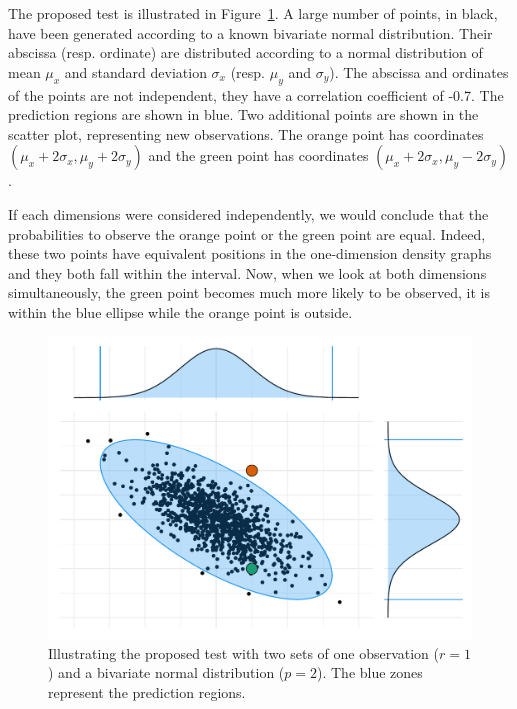             The proposed test is illustrated in Figure~\ref{fig:non_regression:stat:single_point}. A large number of points,
            in black, have been generated according to a known bivariate normal distribution. Their abscissa (resp.
            ordinate) are distributed according to a normal distribution of mean \(\mu_x\) and standard deviation
            \(\sigma_x\) (resp. \(\mu_y\) and \(\sigma_y\)). The abscissa and ordinates of the points are not independent,
            they have a correlation coefficient of -0.7. The  prediction regions are shown in blue. Two
            additional points are shown in the scatter plot, representing new observations. The orange point has coordinates
            \((\mu_x+2\sigma_x,\mu_y+2\sigma_y)\) and the green point has coordinates \((\mu_x+2\sigma_x,\mu_y-2\sigma_y)\).

            If each dimensions were considered independently, we would conclude that the probabilities to observe the orange
            point or the green point are equal. Indeed, these two points have equivalent positions in the one-dimension
            density graphs and they both fall within the  interval. Now, when we look at both dimensions
            simultaneously, the green point becomes much more likely to be observed, it is within the blue ellipse while the
            orange point is outside.

            \begin{figure}[htpb]
                \centering
                \includegraphics[width=0.9\linewidth]{img/experiment/non_regression/statistics/single_point.pdf}
                \caption{Illustrating the proposed test with two sets of one observation (\(r=1\)) and a bivariate normal
                distribution (\(p=2\)). The blue zones represent the  prediction regions.}%
                \label{fig:non_regression:stat:single_point}
            \end{figure}

